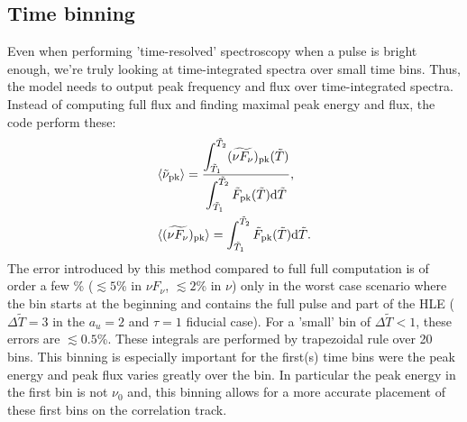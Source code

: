 \documentclass{article}
\newcommand{\pk}{{\rm pk}}
\begin{document}
\subsection{Time binning}\label{sec:tbin}
Even when performing 'time-resolved' spectroscopy when a pulse is bright enough, we're truly looking at time-integrated spectra over small time bins. Thus, the model needs to output peak frequency and flux over time-integrated spectra. Instead of computing full flux and finding maximal peak energy and flux, the code perform these:
\begin{align}
    &\langle \tilde{\nu}_\pk \rangle =  \frac{\displaystyle\int_{\tilde{T}_1}^{\tilde{T}_2}(\widetilde{\nu F_\nu})_\pk(\tilde{T})}{\displaystyle\int_{\tilde{T}_1}^{\tilde{T}_2} \tilde{F}_\pk(\tilde{T}){\rm d}\tilde{T}},\\
    &\langle (\widetilde{\nu F_\nu})_\pk \rangle = \int_{\tilde{T}_1}^{\tilde{T}_2} \tilde{F}_\pk(\tilde{T}){\rm d}\tilde{T}.
\end{align}
The error introduced by this method compared to full full computation is of order a few \% ($\lesssim5$\% in $\nu F_\nu$, $\lesssim2$\% in $\nu$) only in the worst case scenario where the bin starts at the beginning and contains the full pulse and part of the HLE ($\Delta\tilde{T}=3$ in the $a_u=2$ and $\tau=1$ fiducial case). For a 'small' bin of $\Delta \tilde{T}<1$, these errors are $\lesssim 0.5$\%. These integrals are performed by trapezoidal rule over 20 bins. This binning is especially important for the first(s) time bins were the peak energy and peak flux varies greatly over the bin. In particular the peak energy in the first bin is not $\nu_0$ and, this binning allows for a more accurate placement of these first bins on the correlation track. 
\end{document}

